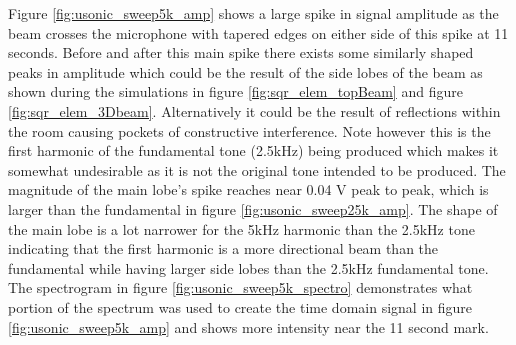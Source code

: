 Figure \ref{fig:usonic_sweep5k_amp} shows a large spike in signal amplitude as the beam crosses the microphone with tapered edges on either side of this spike at 11 seconds. Before and after this main spike there exists some similarly shaped peaks in amplitude which could be the result of the side lobes of the beam as shown during the simulations in figure \ref{fig:sqr_elem_topBeam} and figure \ref{fig:sqr_elem_3Dbeam}. Alternatively it could be the result of reflections within the room causing pockets of constructive interference. Note however this is the first harmonic of the fundamental tone (2.5kHz) being produced which makes it somewhat undesirable as it is not the original tone intended to be produced.
The magnitude of the main lobe's spike reaches near 0.04 V peak to peak, which is larger than the fundamental in figure \ref{fig:usonic_sweep25k_amp}. The shape of the main lobe is a lot narrower for the 5kHz harmonic than the 2.5kHz tone indicating that the first harmonic is a more directional beam than the fundamental while having larger side lobes than the 2.5kHz fundamental tone.
The spectrogram in figure \ref{fig:usonic_sweep5k_spectro} demonstrates what portion of the spectrum was used to create the time domain signal in figure \ref{fig:usonic_sweep5k_amp} and shows more intensity near the 11 second mark.

